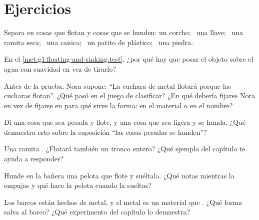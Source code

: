 \section{Ejercicios}

\begin{exercise}[$\star$]\label{exo:g1:floating-and-sinking:1}
Separa en cosas que flotan y cosas que se hunden: un corcho; \ una
llave; \ una ramita seca; \ una canica; \ un patito de plástico; \ una
piedra.
\end{exercise}

\begin{exercise}[$\star$]\label{exo:g1:floating-and-sinking:2}
En el \cref{met:g1:floating-and-sinking:test}, ¿por qué hay que posar
el objeto sobre el agua con suavidad en vez de tirarlo?
\end{exercise}

\begin{exercise}[$\star$]\label{exo:g1:floating-and-sinking:3}
Antes de la prueba, Nora supone: ``La cuchara de metal flotará
porque las cucharas flotan''. ¿Qué pasó en el juego de clasificar?
¿En qué debería fijarse Nora en vez de fijarse en para qué sirve la
forma: en el material o en el nombre?
\end{exercise}

\begin{exercise}[$\star$]\label{exo:g1:floating-and-sinking:4}
Di una cosa que sea pesada y flote, y una cosa que sea ligera y
se hunda. ¿Qué demuestra esto sobre la suposición ``las cosas
pesadas se hunden''?
\end{exercise}

\begin{exercise}[$\star$]\label{exo:g1:floating-and-sinking:5}
Una ramita . ¿Flotará también un tronco entero? ¿Qué
ejemplo del capítulo te ayuda a responder?
\end{exercise}

\begin{exercise}[$\star$]\label{exo:g1:floating-and-sinking:6}
Hunde en la bañera una pelota que flote y suéltala. ¿Qué notas
mientras la empujas y qué hace la pelota cuando la sueltas?
\end{exercise}

\begin{exercise}[$\star$]\label{exo:g1:floating-and-sinking:7}
Los barcos están hechos de metal, y el metal es un material que . ¿Qué forma salva al barco? ¿Qué experimento del capítulo lo
demuestra?
\end{exercise}

